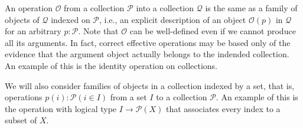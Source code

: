 An operation $\mathcal{O}$ from a collection $\mathcal{P}$ into a collection
$\mathcal{Q}$ is the same as a family of objects of $\mathcal{Q}$ indexed on
$\mathcal{P}$, i.e., an explicit description of an object $\mathcal{O}(p)$ in
$\mathcal{Q}$ for an arbitrary $p : \mathcal{P}$. Note that $\mathcal{O}$ can be
well-defined even if we cannot produce all its arguments. In fact, correct
effective operations may be based only of the evidence that the argument object
actually belongs to the indended collection. An example of this is the identity
operation on collections.

We will also consider families of objects in a collection indexed by a set, that
is, operations $p(i) : \mathcal{P} (i \in I)$ from a set $I$ to a collection
$\mathcal{P}$. An example of this is the operation with logical type $I
\rightarrow \mathcal{P}(X)$ that associates every index to a subset of $X$.

